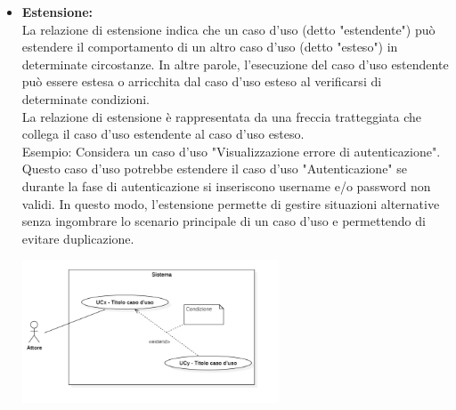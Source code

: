 \begin{itemize}
\begin{itemize}
        \item \textbf{Estensione:} \\
        La relazione di estensione indica che un caso d'uso (detto "estendente") può estendere il comportamento di un altro caso d'uso (detto "esteso") in determinate circostanze. In altre parole, l'esecuzione del caso d'uso estendente può essere estesa o arricchita dal caso d'uso esteso al verificarsi di determinate condizioni. \\
        La relazione di estensione è rappresentata da una freccia tratteggiata che collega il caso d'uso estendente al caso d'uso esteso. \\
        Esempio: Considera un caso d'uso "Visualizzazione errore di autenticazione". Questo caso d'uso potrebbe estendere il caso d'uso "Autenticazione" se durante la fase di autenticazione si inseriscono username e/o password non validi. In questo modo, l'estensione permette di gestire situazioni alternative senza ingombrare lo scenario principale di un caso d'uso e permettendo di evitare duplicazione.
        \begin{minipage}[t]{\linewidth}
            \centering
            \includegraphics[width=0.6\textwidth]{../Images/NormeDiProgetto/Estensione.PNG}
        \end{minipage}


\end{itemize}
\end{itemize}
